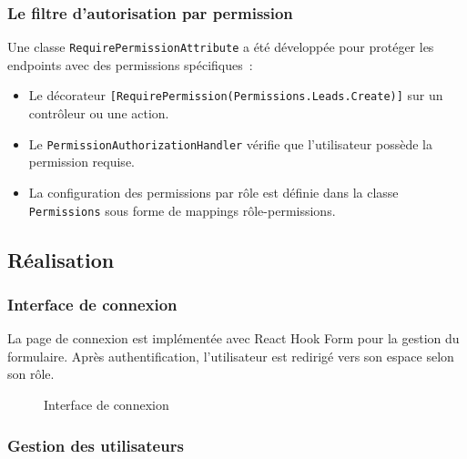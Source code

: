 \subsubsection{Le filtre d'autorisation par permission}

Une classe \texttt{RequirePermissionAttribute} a été développée pour protéger les endpoints
avec des permissions spécifiques~:

\begin{itemize}
    \item Le décorateur \texttt{[RequirePermission(Permissions.Leads.Create)]} sur un contrôleur
    ou une action.
    \item Le \texttt{PermissionAuthorizationHandler} vérifie que l'utilisateur possède la
    permission requise.
    \item La configuration des permissions par rôle est définie dans la classe
    \texttt{Permissions} sous forme de mappings rôle-permissions.
\end{itemize}

\subsection{Réalisation}
\label{subsec:sprint1_realisation}

\subsubsection{Interface de connexion}

La page de connexion est implémentée avec React Hook Form pour la gestion du formulaire.
Après authentification, l'utilisateur est redirigé vers son espace selon son rôle.

\begin{figure}[H]
    \centering
    \caption{Interface de connexion}
    \label{fig:sprint1_login}
\end{figure}

\subsubsection{Gestion des utilisateurs}

